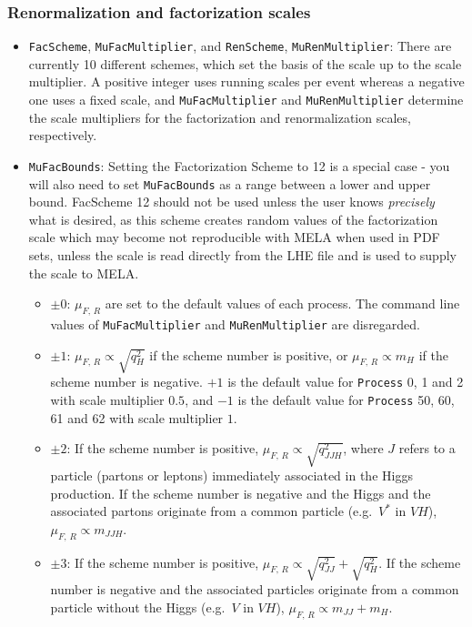 \documentclass[aps,superscriptaddress,nofootinbib]{revtex4}
\newcommand{\eg}{e.g.~}
\begin{document}
\subsubsection{Renormalization and factorization scales}
\begin{itemize}
	\item \verb|FacScheme|, \verb|MuFacMultiplier|, and \verb|RenScheme|, \verb|MuRenMultiplier|: There are currently 10 different schemes, which set the basis of the scale up to the scale multiplier. A positive integer uses running scales per event whereas a negative one uses a fixed scale, and \verb|MuFacMultiplier| and \verb|MuRenMultiplier| determine the scale multipliers for the factorization and renormalization scales, respectively.
  \item \verb|MuFacBounds|: Setting the Factorization Scheme to 12 is a special case - you will also need to set \verb|MuFacBounds| as a range between a lower and upper bound. 
  FacScheme 12 should not be used unless the user knows \textit{precisely} what is desired, as this scheme creates random values of the factorization scale which may become not reproducible with MELA when used in PDF sets, unless the scale is read directly from the LHE file and is used to supply the scale to MELA.
	\begin{itemize}
		\item $\pm0$: $\mu_{F,\,R}$ are set to the default values of each process. The command line values of \verb|MuFacMultiplier| and \verb|MuRenMultiplier| are disregarded.
		\item $\pm1$: $\mu_{F,\,R} \propto \sqrt{q^2_H}$ if the scheme number is positive, or $\mu_{F,\,R} \propto m_H$ if the scheme number is negative. $+1$ is the default value for \verb|Process| 0, 1 and 2 with scale multiplier $0.5$, and  $-1$ is the default value for \verb|Process| 50, 60, 61 and 62 with scale multiplier $1$.
		\item $\pm2$: If the scheme number is positive, $\mu_{F,\,R} \propto \sqrt{q^2_{JJH}}$, where $J$ refers to a particle (partons or leptons) immediately associated in the Higgs production. If the scheme number is negative and the Higgs and the associated partons originate from a common particle (\eg $V^{*}$ in $VH$), $\mu_{F,\,R} \propto m_{JJH}$.
		\item $\pm3$: If the scheme number is positive, $\mu_{F,\,R} \propto \sqrt{q^2_{JJ}}+\sqrt{q^2_{H}}$. If the scheme number is negative and the associated particles originate from a common particle without the Higgs (\eg $V$ in $VH$), $\mu_{F,\,R} \propto m_{JJ}+m_{H}$.

\end{itemize}
\end{itemize}
\end{document}
